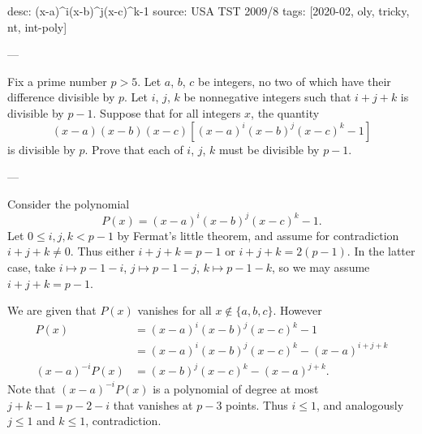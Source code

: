 desc: (x-a)^i(x-b)^j(x-c)^k-1
source: USA TST 2009/8
tags: [2020-02, oly, tricky, nt, int-poly]

---

Fix a prime number $p>5$. Let $a$, $b$, $c$ be integers, no two of which have their difference divisible by $p$. Let $i$, $j$, $k$ be nonnegative integers such that $i+j+k$ is divisible by $p-1$. Suppose that for all integers $x$, the quantity \[(x-a)(x-b)(x-c)\left[(x-a)^i(x-b)^j(x-c)^k-1\right]\]
is divisible by $p$. Prove that each of $i$, $j$, $k$ must be divisible by $p-1$.

---

Consider the polynomial \[P(x)=(x-a)^i(x-b)^j(x-c)^k-1.\]
Let $0\le i,j,k<p-1$ by Fermat's little theorem, and assume for contradiction $i+j+k\ne0$. Thus either $i+j+k=p-1$ or $i+j+k=2(p-1)$. In the latter case, take $i\mapsto p-1-i$, $j\mapsto p-1-j$, $k\mapsto p-1-k$, so we may assume $i+j+k=p-1$.

We are given that $P(x)$ vanishes for all $x\not\in\{a,b,c\}$. However
\begin{align*}
    P(x)&=(x-a)^i(x-b)^j(x-c)^k-1\\
    &=(x-a)^i(x-b)^j(x-c)^k-(x-a)^{i+j+k}\\
    (x-a)^{-i}P(x)&=(x-b)^j(x-c)^k-(x-a)^{j+k}.
\end{align*}
Note that $(x-a)^{-i}P(x)$ is a polynomial of degree at most $j+k-1=p-2-i$ that vanishes at $p-3$ points. Thus $i\le1$, and analogously $j\le1$ and $k\le1$, contradiction.

